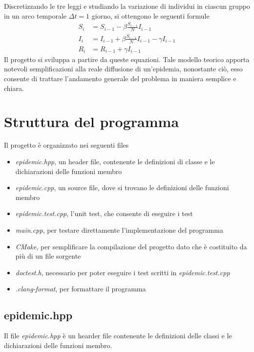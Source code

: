 \documentclass[11pt, a4paper]{article}
\begin{document}
Discretizzando le tre leggi e studiando la variazione di individui in ciascun 
gruppo in un arco temporale $\Delta t=1$ giorno, si ottengono le seguenti formule
\begin{equation}
\begin{align*} 
S_i &= S_{i-1} - \beta \frac{S_{i-1}}{N} I_{i-1} \\
I_i &= I_{i-1} + \beta \frac{S_{i-1}}{N} I_{i-1} - \gamma I_{i-1} \\
R_i &= R_{i-1} + \gamma I_{i-1} 
\end{align*}
\end{equation}
Il progetto si sviluppa a partire da queste equazioni.
Tale modello teorico apporta notevoli semplificazioni alla reale 
diffusione di un'epidemia, nonostante ci\`{o}, esso consente di trattare 
l'andamento generale del problema in maniera semplice e chiara.

\section{Struttura del programma}
Il progetto \`{e} organizzato nei seguenti files 
\begin{itemize}
\item \textit{epidemic.hpp}, un header file, contenente le definizioni di classe e le dichiarazioni delle funzioni membro 
\item \textit{epidemic.cpp}, un source file, dove si trovano le definizioni delle funzioni membro
\item \textit{epidemic.test.cpp}, l'unit test, che consente di eseguire i test
\item \textit{main.cpp}, per testare direttamente l'implementazione del programma
\item \textit{CMake}, per semplificare la compilazione del progetto dato che è costituito da pi\`{u} di un file sorgente
\item \textit{doctest.h}, necessario per poter eseguire i test scritti in 
\textit{epidemic.test.cpp}
\item \textit{.clang-format}, per formattare il programma
\end{itemize}


\subsection{epidemic.hpp}
Il file \textit{epidemic.hpp} è un hearder file contenente le definizioni delle classi e le dichiarazioni delle funzioni membro. \\
\end{document}
